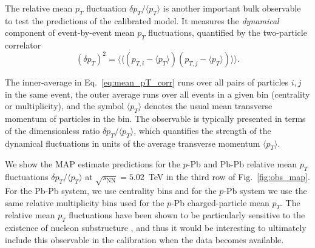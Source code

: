 \documentclass[aps,prc,reprint,amsmath,nofootinbib]{revtex4-1}
\newcommand{\sqrts}{\sqrt{s_\mathrm{NN}}}
\begin{document}
The relative mean $p_T$ fluctuation $\delta p_T / \langle p_T \rangle$ is another important bulk observable to test the predictions of the calibrated model.
It measures the \emph{dynamical} component of event-by-event mean $p_T$ fluctuations, quantified by the two-particle correlator
\begin{equation}
  \label{eq:mean_pT_corr}
  (\delta p_T)^2 = \langle \langle (p_{T,i} - \langle p_T \rangle) (p_{T,j} - \langle p_T \rangle) \rangle \rangle.
\end{equation}

\noindent The inner-average in Eq.~\eqref{eq:mean_pT_corr} runs over all pairs of particles $i,j$ in the same event, the outer average runs over all events in a given bin (centrality or multiplicity), and the symbol $\langle p_T \rangle$ denotes the usual mean transverse momentum of particles in the bin.
The observable is typically presented in terms of the dimensionless ratio $\delta p_T / \langle p_T \rangle$, which quantifies the strength of the dynamical fluctuations in units of the average transverse momentum $\langle p_T \rangle$.

We show the MAP estimate predictions for the $p$-Pb and Pb-Pb relative mean $p_T$ fluctuations $\delta p_T / \langle p_T \rangle$ at $\sqrts=5.02$~TeV in the third row of Fig.~\ref{fig:obs_map}.
For the Pb-Pb system, we use centrality bins and for the $p$-Pb system we use the same relative multiplicity bins used for the $p$-Pb charged-particle mean $p_T$.
The relative mean $p_T$ fluctuations have been shown to be particularly sensitive to the existence of nucleon substructure \cite{Bozek:2017elk}, and thus it would be interesting to ultimately include this observable in the calibration when the data becomes available.
\end{document}

